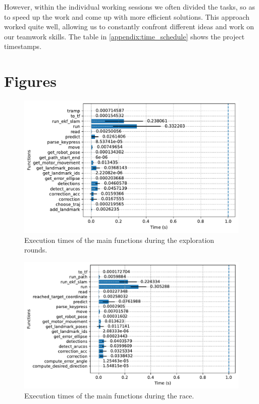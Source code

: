 \documentclass[
	12pt,
]{sty/report_style}
\newcommand{\todo}[1]{\textcolor{red}{TODO: #1}}
\begin{document}
However, within the individual working sessions we often divided the tasks, so as to speed up the work and come up with more efficient solutions. This approach worked quite well, allowing us to constantly confront different ideas and work on our teamwork skills. The table in \cref{appendix:time_schedule} shows the project timestamps.



\clearpage
\appendix

\section{Figures}\label{appendix:figures}

\begin{figure}[h]
    \centering
    \includegraphics[width=\textwidth]{img/Exploration.pdf}
    \caption{Execution times of the main functions during the exploration rounds.} 
    \label{fig:exec_times_exploration} 
\end{figure}

\begin{figure}[h]
    \centering
    \includegraphics[width=\textwidth]{img/Race.pdf}
    \caption{Execution times of the main functions during the race.} 
    \label{fig:exec_times_race} 
\end{figure}
\end{document}
